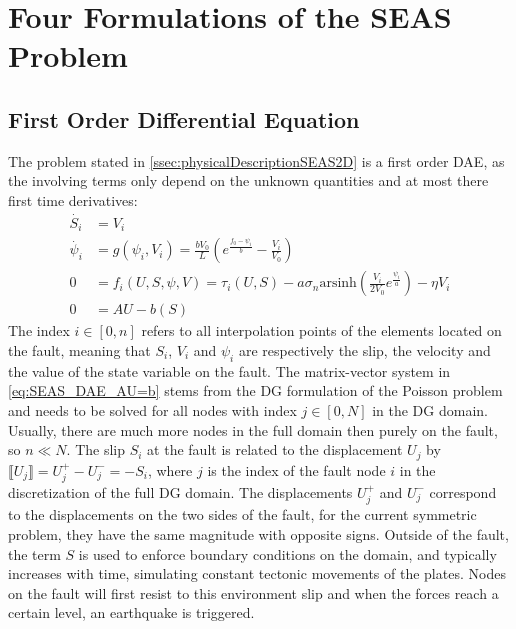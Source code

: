 \chapter{Four Formulations of the SEAS Problem}
\label{chap:44rmulations4SEAS}

\section{First Order Differential Equation}
The problem stated in \autoref{ssec:physicalDescriptionSEAS2D} is a first order DAE, as the involving terms only depend on the unknown quantities and at most there first time derivatives:
\begin{align}
    \dot{S_i} &= V_i \label{eq:SEASDAE_dV_dt} \\
	\dot{\psi_i} &= g(\psi_i, V_i) =\frac{bV_0}{L}\left(e^{\frac{f_0-\psi_i}{b}} - \frac{V_i}{V_0}\right) \label{eq:SEAS_DAE_ageing_law} \\
	0 &= f_i(U,S,\psi,V) = \tau_i(U,S) - a\sigma_n\text{arsinh}\left(\frac{V_i}{2V_0}e^{\frac{\psi_i}{a}}\right) -\eta V_i \label{eq:SEASDAE_frictionLaw}\\
    0 &= AU - b(S) \label{eq:SEAS_DAE_AU=b}  
\end{align}
The index $i\in[0,n]$ refers to all interpolation points of the elements located on the fault, meaning that $S_i$, $V_i$ and $\psi_i$ are respectively the slip, the velocity and the value of the state variable on the fault. The matrix-vector system in \autoref{eq:SEAS_DAE_AU=b} stems from the DG formulation of the Poisson problem and needs to be solved for all nodes with index $j\in[0,N]$ in the DG domain. Usually, there are much more nodes in the full domain then purely on the fault, so $n \ll N$. The slip $S_i$ at the fault is related to the displacement $U_j$ by $\llbracket U_j \rrbracket = U_j^+ - U_j^- = -S_i$, where $j$ is the index of the fault node $i$ in the discretization of the full DG domain. The displacements $U_j^+$ and $U_j^-$ correspond to the displacements on the two sides of the fault, for the current symmetric problem, they have the same magnitude with opposite signs. Outside of the fault, the term $S$ is used to enforce boundary conditions on the domain, and typically increases with time, simulating constant tectonic movements of the plates. Nodes on the fault will first resist to this environment slip and when the forces reach a certain level, an earthquake is triggered. \\
